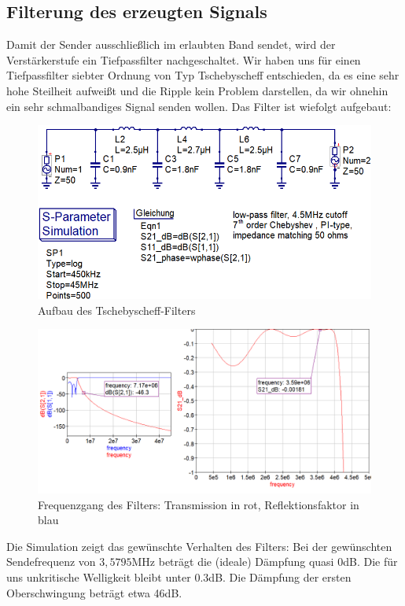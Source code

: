 \subsection{Filterung des erzeugten Signals}
Damit der Sender ausschließlich im erlaubten Band sendet, wird der Verstärkerstufe
ein Tiefpassfilter nachgeschaltet. Wir haben uns für einen Tiefpassfilter siebter
Ordnung von Typ Tschebyscheff entschieden, da es eine sehr hohe Steilheit aufweißt
und die Ripple kein Problem darstellen, da wir ohnehin ein sehr schmalbandiges
Signal senden wollen. Das Filter ist wiefolgt aufgebaut:
\begin{figure}[H]
\includegraphics{res/TP_Schaltplan.png}
\caption{Aufbau des Tschebyscheff-Filters}
\end{figure}

\begin{figure}[H]
\includegraphics[scale=0.6]{res/TP_Simulation.png}
\caption{Frequenzgang des Filters: Transmission in rot, Reflektionsfaktor in blau}
\end{figure}
Die Simulation zeigt das gewünschte Verhalten des Filters: Bei der gewünschten
Sendefrequenz von $3,5795$MHz beträgt die (ideale) Dämpfung quasi $0$dB.
Die für uns unkritische Welligkeit bleibt unter $0.3$dB.
Die Dämpfung der ersten Oberschwingung beträgt etwa 46dB.

